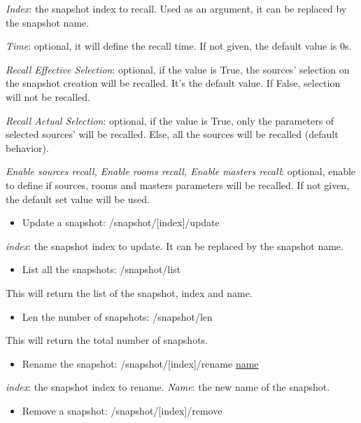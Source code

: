 \documentclass[
  letterpaper,
  DIV=11,
  numbers=noendperiod]{scrreport}
\providecommand{\tightlist}{%
  \setlength{\itemsep}{0pt}\setlength{\parskip}{0pt}}\usepackage{longtable,booktabs,array}
\begin{document}
\emph{Index}: the snapshot index to recall. Used as an argument, it can
be replaced by the snapshot name.

\emph{Time}: optional, it will define the recall time. If not given, the
default value is 0s.

\emph{Recall Effective Selection}: optional, if the value is True, the
sources' selection on the snapshot creation will be recalled. It's the
default value. If False, selection will not be recalled.

\emph{Recall Actual Selection}: optional, if the value is True, only the
parameters of selected sources' will be recalled. Else, all the sources
will be recalled (default behavior).

\emph{Enable sources recall, Enable rooms recall, Enable masters
recall}: optional, enable to define if sources, rooms and masters
parameters will be recalled. If not given, the default set value will be
used.

\begin{itemize}
\tightlist
\item
  Update a snapshot: /snapshot/{[}index{]}/update
\end{itemize}

\emph{index}: the snapshot index to update. It can be replaced by the
snapshot name.

\begin{itemize}
\tightlist
\item
  List all the snapshots: /snapshot/list
\end{itemize}

This will return the list of the snapshot, index and name.

\begin{itemize}
\tightlist
\item
  Len the number of snapshots: /snapshot/len
\end{itemize}

This will return the total number of snapshots.

\begin{itemize}
\tightlist
\item
  Rename the snapshot: /snapshot/{[}index{]}/rename
  \protect\hyperlink{name-2}{name}
\end{itemize}

\emph{index}: the snapshot index to rename. \emph{Name}: the new name of
the snapshot.

\begin{itemize}
\tightlist
\item
  Remove a snapshot: /snapshot/{[}index{]}/remove
\end{itemize}
\end{document}
